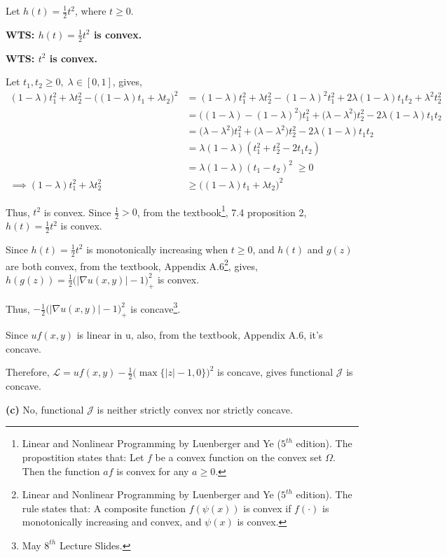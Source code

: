 \documentclass[12pt]{article}
\begin{document}
Let $h(t) = \frac{1}{2}t^2$, where $t \ge 0$.

\quad \textbf{WTS: $h(t) = \frac{1}{2}t^2$ is convex.}

\quad \quad \textbf{WTS: $t^2$ is convex.}

\quad \quad Let $t_1,t_2 \ge 0,\;\lambda\in[0,1]$, gives, 
\begin{align*}
	(1-\lambda)t_1^2 + \lambda t_2^2 - \big((1-\lambda)t_1 + \lambda t_2\big)^2 &= (1-\lambda)t_1^2 + \lambda t_2^2 -  (1-\lambda)^2 t_1^2 + 2\lambda(1-\lambda)t_1t_2 + \lambda^2 t_2^2 \\
	&= \big((1-\lambda) - (1-\lambda)^2\big)t_1^2+ \big(\lambda - \lambda^2\big)t_2^2- 2\lambda(1-\lambda)t_1t_2 \\
	&= \big(\lambda - \lambda^2\big)t_1^2 + \big(\lambda - \lambda^2\big)t_2^2 - 2\lambda(1-\lambda)t_1t_2 \\
	&= \lambda(1-\lambda)(t_1^2 + t_2^2 - 2t_1t_2) \\
	&= \lambda(1-\lambda)(t_1 - t_2)^2 \;\ge 0 \\
	\implies (1-\lambda)t_1^2 + \lambda t_2^2 &\ge \big((1-\lambda)t_1 + \lambda t_2\big)^2
\end{align*}

Thus, $t^2$ is convex. Since $\frac{1}{2}>0$, from the textbook\footnote{Linear and Nonlinear Programming by Luenberger and Ye ($5^{th}$ edition). The propostition states that: Let $f$ be a convex function on the convex set $\Omega$. Then the function $a f$ is convex for any $a \ge 0$.}, 7.4 proposition 2, $h(t) = \frac{1}{2}t^2$ is convex.

Since $h(t) = \frac{1}{2}t^2$ is monotonically increasing when $t \ge 0$, and $h(t)$ and $g(z)$ are both convex, from the textbook, Appendix A.6\footnote{Linear and Nonlinear Programming by Luenberger and Ye ($5^{th}$ edition). The rule states that: A composite function $f(\psi(x))$ is convex if $f(\cdot)$ is monotonically increasing and convex, and $\psi(x)$ is convex.}, gives, $h(g(z)) = \frac{1}{2}\big(|\nabla u(x,y)|-1\big)_+^2$ is convex. 

Thus, $-\frac{1}{2}\big(|\nabla u(x,y)|-1\big)_+^2$ is concave\footnote{May $8^{th}$ Lecture Slides.}.

Since $uf(x,y)$ is linear in u, also, from the textbook, Appendix A.6, it's concave.

Therefore, $\mathcal L = uf(x,y) - \frac{1}{2}\Big(\max\{|z| - 1, 0\}\Big)^2$ is concave, gives functional $\mathcal J$ is concave.

\newpage
\noindent
\textbf{(c)} No, functional $\mathcal J$ is neither strictly convex nor strictly concave.
\end{document}

